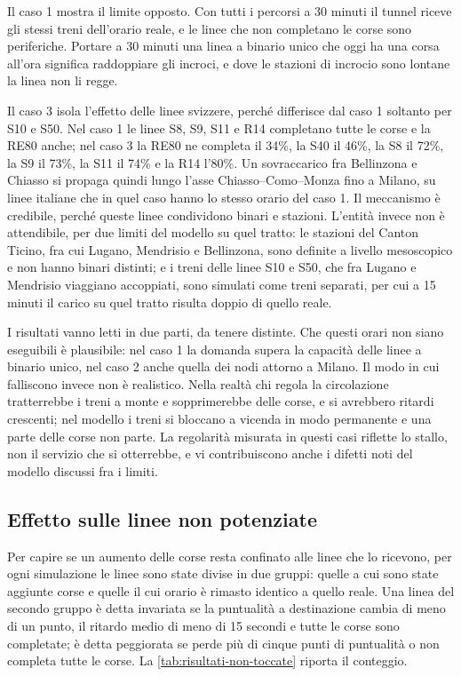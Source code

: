 Il caso 1 mostra il limite opposto. Con tutti i percorsi a 30 minuti il tunnel riceve gli stessi treni dell'orario reale, e le linee che non completano le corse sono periferiche. Portare a 30 minuti una linea a binario unico che oggi ha una corsa all'ora significa raddoppiare gli incroci, e dove le stazioni di incrocio sono lontane la linea non li regge.

Il caso 3 isola l'effetto delle linee svizzere, perché differisce dal caso 1 soltanto per S10 e S50. Nel caso 1 le linee S8, S9, S11 e R14 completano tutte le corse e la RE80 anche; nel caso 3 la RE80 ne completa il 34\%, la S40 il 46\%, la S8 il 72\%, la S9 il 73\%, la S11 il 74\% e la R14 l'80\%. Un sovraccarico fra Bellinzona e Chiasso si propaga quindi lungo l'asse Chiasso--Como--Monza fino a Milano, su linee italiane che in quel caso hanno lo stesso orario del caso 1. Il meccanismo è credibile, perché queste linee condividono binari e stazioni. L'entità invece non è attendibile, per due limiti del modello su quel tratto: le stazioni del Canton Ticino, fra cui Lugano, Mendrisio e Bellinzona, sono definite a livello mesoscopico e non hanno binari distinti; e i treni delle linee S10 e S50, che fra Lugano e Mendrisio viaggiano accoppiati, sono simulati come treni separati, per cui a 15 minuti il carico su quel tratto risulta doppio di quello reale.

I risultati vanno letti in due parti, da tenere distinte. Che questi orari non siano eseguibili è plausibile: nel caso 1 la domanda supera la capacità delle linee a binario unico, nel caso 2 anche quella dei nodi attorno a Milano. Il modo in cui falliscono invece non è realistico. Nella realtà chi regola la circolazione tratterrebbe i treni a monte e sopprimerebbe delle corse, e si avrebbero ritardi crescenti; nel modello i treni si bloccano a vicenda in modo permanente e una parte delle corse non parte. La regolarità misurata in questi casi riflette lo stallo, non il servizio che si otterrebbe, e vi contribuiscono anche i difetti noti del modello discussi fra i limiti.

\subsection{Effetto sulle linee non potenziate}
Per capire se un aumento delle corse resta confinato alle linee che lo ricevono, per ogni simulazione le linee sono state divise in due gruppi: quelle a cui sono state aggiunte corse e quelle il cui orario è rimasto identico a quello reale. Una linea del secondo gruppo è detta invariata se la puntualità a destinazione cambia di meno di un punto, il ritardo medio di meno di 15 secondi e tutte le corse sono completate; è detta peggiorata se perde più di cinque punti di puntualità o non completa tutte le corse. La \cref{tab:risultati-non-toccate} riporta il conteggio.

